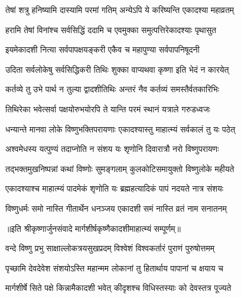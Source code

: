 \twolineshloka
{तेषां शत्रु हनिष्यामि दास्यामि परमां गतिम्}
{अन्येऽपि ये करिष्यन्ति एकादश्या महाव्रतम्} %

\twolineshloka
{हरामि तेषां विनांश्च सर्वसिद्धिं ददामि च}
{एवमुक्का समुत्पत्तिरेकादश्याः पृथासुत} %

\twolineshloka
{इयमेकादशी नित्या सर्वपापक्षयङ्करी}
{एकैव च महापुण्या सर्वपापनिषूदनी} %

\twolineshloka
{उदिता सर्वलोकेषु सर्वसिद्धिकरी तिथिः}
{शुक्का वाप्यथवा कृष्णा इति भेदं न कारयेत्} %

\twolineshloka
{कर्तव्ये तु उभे पार्थ न तुल्या द्वादशीतिथिः}
{अन्तरं नैव कर्तव्यं समस्तैर्वतकारिभिः} %

\twolineshloka
{तिथिरेका भवेत्सर्वा पक्षयोरुभयोरपि}
{ते यान्ति परमं स्थानं यत्राले गरुडध्वजः} %

\twolineshloka
{धन्यान्ते मानवा लोके विष्णुभक्तिपरायणाः}
{एकादश्यास्तु माहात्म्यं सर्वकालं तु यः पठेत्} %

\twolineshloka
{अश्वमेधस्य यत्पुण्यं तदाप्नोति न संशय}
{यः शृणोनि दिवारात्रौ नरो विष्णुपरायणः} %

\twolineshloka
{तद्भक्तमुखनिष्पन्नां कथां विष्णोः सुमङ्गलाम्}
{कुलकोटिसमायुक्तो विष्णुलोके महीयते} %

\twolineshloka
{एकादश्याश्च माहात्म्यं पादमेकं शृणोति यः}
{ब्रह्महत्यादिकं पापं नदयते नात्र संशयः} %

\twolineshloka
{विष्णुधर्मः समो नास्ति गीतार्थेन धनञ्जय}
{एकादशी समं नास्ति व्रतं नाम सनातनम्} %

॥इति श्रीकृष्णार्जुनसंवादे मार्गशीर्षकृष्णैकादशीमाहात्म्यं सम्पूर्णम्॥


\hyperref[sec:ekadashi_mahatmyam_vrata_raja]{\closesub}
\clearpage

\label{sec:vrata-raja-margashirsha-shukla-mokshada}


\twolineshloka
{वन्दे विष्णु प्रभु साक्षाल्लोकत्रयसुखप्रदम्}
{विश्वेशं विश्वकर्तारं पुराणं पुरुषोत्तमम्} %

\twolineshloka
{पृच्छामि देवदेवेश संशयोऽस्ति महान्मम}
{लोकानां तु हितार्थाय पापानां च क्षयाय च} %

\twolineshloka
{मार्गशीर्षे सिते पक्षे किन्नामैकादशी भवेत्}
{कीदृशश्च विधिस्तस्याः को देवस्तत्र पूज्यते} %



